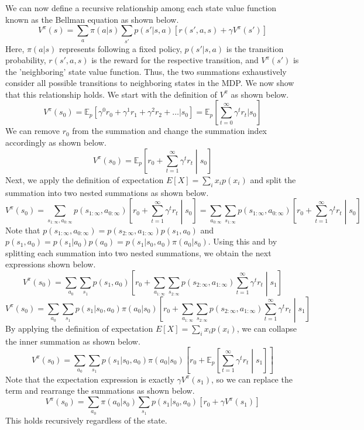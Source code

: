 \documentclass[11pt]{article}
\begin{document}
We can now define a recursive relationship among each state value function known as the Bellman equation as shown below.
\[ V^\pi(s) = \sum_a \pi(a|s)\sum_{s'}p(s'|s,a)[r(s', a, s) + \gamma V^\pi(s')] \]
Here, $\pi(a|s)$ represents following a fixed policy, $p(s'|s,a)$ is the transition probability, $r(s', a, s)$ is the reward for the respective transition, and $V^\pi(s')$ is the 'neighboring' state value function. Thus, the two summations exhaustively consider all possible transitions to neighboring states in the MDP.
We now show that this relationship holds. We start with the definition of $V^\pi$ as shown below.
\[ V^\pi(s_0) = \mathds{E}_p [\gamma^0 r_0 + \gamma^1 r_1 + \gamma^2 r_2 + \dots | s_0] = \mathds{E}_p \left[\sum_{t=0}^\infty \gamma^tr_t|s_0 \right] \]
We can remove $r_0$ from the summation and change the summation index accordingly as shown below.
\[ V^\pi(s_0) = \mathds{E}_p \left[r_0 + \sum_{t=1}^\infty \gamma^tr_t \middle| s_0 \right] \]
Next, we apply the definition of expectation $E[X] = \sum_i x_ip(x_i)$ and split the summation into two nested summations as shown below.
\[ V^\pi(s_0) = \sum_{s_{1:\infty},a_{0:\infty}} p(s_{1:\infty},a_{0:\infty}) \left[r_0 + \sum_{t=1}^\infty \gamma^tr_t\middle|s_0 \right] = \sum_{a_{0:\infty}}\sum_{s_{1:\infty}} p(s_{1:\infty},a_{0:\infty}) \left[r_0 + \sum_{t=1}^\infty \gamma^tr_t\middle|s_0 \right] \]
Note that $p(s_{1:\infty},a_{0:\infty}) = p(s_{2:\infty},a_{1:\infty})p(s_{1},a_{0})$ and $p(s_{1},a_{0}) = p(s_{1}|a_{0})p(a_0) = p(s_{1}|s_0, a_0)\pi(a_0|s_0)$. Using this and by splitting each summation into two nested summations, we obtain the next expressions shown below.
\[ V^\pi(s_0) = \sum_{a_{0}}\sum_{s_{1}} p(s_{1},a_{0}) \left[r_0 + \sum_{a_{1:\infty}}\sum_{s_{2:\infty}} p(s_{2:\infty},a_{1:\infty}) \sum_{t=1}^\infty \gamma^tr_t\middle|s_1 \right] \]
\[ V^\pi(s_0) = \sum_{a_{0}}\sum_{s_{1}} p(s_{1}|s_0, a_0)\pi(a_0|s_0) \left[r_0 + \sum_{a_{1:\infty}}\sum_{s_{2:\infty}} p(s_{2:\infty},a_{1:\infty}) \sum_{t=1}^\infty \gamma^tr_t\middle|s_1 \right] \]
By applying the definition of expectation $E[X] = \sum_i x_ip(x_i)$, we can collapse the inner summation as shown below.
\[ V^\pi(s_0) = \sum_{a_{0}}\sum_{s_{1}} p(s_{1}|s_0, a_0)\pi(a_0|s_0) \left[r_0 + \mathds{E}_p \left[\sum_{t=1}^\infty \gamma^tr_t\middle|s_1 \right]\right] \]
Note that the expectation expression is exactly $\gamma V^\pi(s_1)$, so we can replace the term and rearrange the summations as shown below.
\[ V^\pi(s_0) = \sum_{a_{0}}\pi(a_0|s_0)\sum_{s_{1}} p(s_{1}|s_0, a_0) \left[r_0 + \gamma V^\pi(s_1)\right] \]
This holds recursively regardless of the state.
\end{document}
